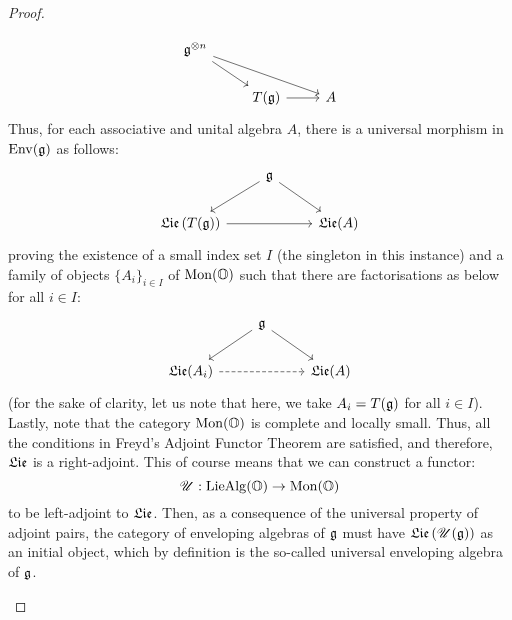 \begin{proof}
\begin{enumerate}
                            $$
                                \begin{tikzcd}
                                	{\g^{\tensor n}} \\
                                	& {T(\g)} & {A}
                                	\arrow[from=1-1, to=2-2]
                                	\arrow[from=2-2, to=2-3]
                                	\arrow[from=1-1, to=2-3]
                                \end{tikzcd}
                            $$
                        Thus, for each associative and unital algebra $A$, there is a universal morphism in $\mathrm{Env}(\mathfrak{g})$ as follows:
                            $$
                                \begin{tikzcd}
                                	& {\g} \\
                                	{\frakLie\left(T(\g)\right)} && {\frakLie(A)}
                                	\arrow[from=2-1, to=2-3]
                                	\arrow[from=1-2, to=2-1]
                                	\arrow[from=1-2, to=2-3]
                                \end{tikzcd}
                            $$
                        proving the existence of a small index set $I$ (the singleton in this instance) and a family of objects $\{A_i\}_{i \in I}$ of $\mathrm{Mon}(\mathbb{O})$ such that there are factorisations as below for all $i \in I$:
                            $$
                                \begin{tikzcd}
                                	& {\g} \\
                                	{\frakLie(A_i)} && {\frakLie(A)}
                                	\arrow[from=2-1, to=2-3, dashed]
                                	\arrow["{}"', from=1-2, to=2-1]
                                	\arrow["{}", from=1-2, to=2-3]
                                \end{tikzcd}
                            $$
                        (for the sake of clarity, let us note that here, we take $A_i = T(\mathfrak{g})$ for all $i \in I$). Lastly, note that the category $\mathrm{Mon}(\mathbb{O})$ is complete and locally small. Thus, all the conditions in Freyd's Adjoint Functor Theorem are satisfied, and therefore, $\mathfrak{Lie}$ is a right-adjoint. This of course means that we can construct a functor:
                            $$\mathscr{U}: \mathrm{Lie}\mathrm{Alg}(\mathbb{O}) \to \mathrm{Mon}(\mathbb{O})$$
                        to be left-adjoint to $\mathfrak{Lie}$. Then, as a consequence of the universal property of adjoint pairs, the category of enveloping algebras of $\mathfrak{g}$ must have $\mathfrak{Lie}\left(\mathscr{U}(\mathfrak{g})\right)$ as an initial object, which by definition is the so-called universal enveloping algebra of $\mathfrak{g}$.

\end{enumerate}
\end{proof}
